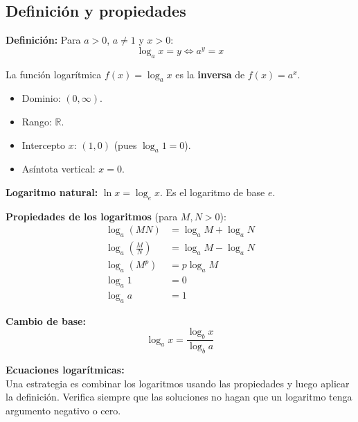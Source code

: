 \documentclass[12pt, a4paper]{article}
\begin{document}
  \subsection{Definición y propiedades}

  \begin{cuadroteoria}
    \textbf{Definición:} Para $a > 0$, $a \neq 1$ y $x > 0$:
    $$\boxed{\log_a x = y \iff a^y = x}$$

    La función logarítmica $f(x) = \log_a x$ es la \textbf{inversa} de $f(x) = a^x$.

    \begin{itemize}[leftmargin=*]
      \item Dominio: $(0, \infty)$.
      \item Rango: $\mathbb{R}$.
      \item Intercepto $x$: $(1, 0)$ (pues $\log_a 1 = 0$).
      \item Asíntota vertical: $x = 0$.
    \end{itemize}

    \textbf{Logaritmo natural:} $\ln x = \log_e x$. Es el logaritmo de base $e$.
  \end{cuadroteoria}

  \begin{cuadrosolucion}
    \textbf{Propiedades de los logaritmos} (para $M, N > 0$):
    \begin{align*}
      \log_a (MN)                     & = \log_a M + \log_a N \\
      \log_a \left(\frac{M}{N}\right) & = \log_a M - \log_a N \\
      \log_a (M^p)                    & = p \log_a M          \\
      \log_a 1                        & = 0                   \\
      \log_a a                        & = 1
    \end{align*}

    \textbf{Cambio de base:}
    $$\log_a x = \frac{\log_b x}{\log_b a}$$
  \end{cuadrosolucion}

  \begin{cuadroadvertencia}
    \textbf{Ecuaciones logarítmicas:}\\
    Una estrategia es combinar los logaritmos usando las propiedades y luego aplicar la definición. Verifica siempre que las soluciones no hagan que un logaritmo tenga argumento negativo o cero.
  \end{cuadroadvertencia}
\end{document}
